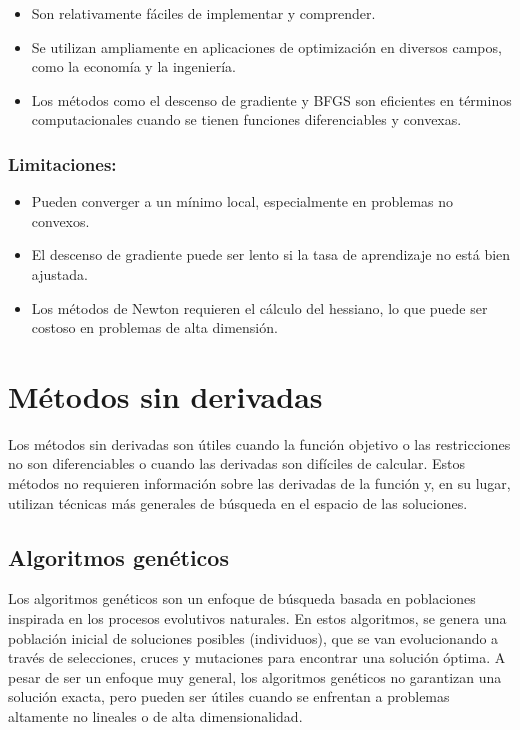 \begin{itemize}
	\item Son relativamente fáciles de implementar y comprender.
	\item Se utilizan ampliamente en aplicaciones de optimización en diversos campos, como la economía y la ingeniería.
	\item Los métodos como el descenso de gradiente y BFGS son eficientes en términos computacionales cuando se tienen funciones diferenciables y convexas.
\end{itemize}

\subsubsection{Limitaciones:}

\begin{itemize}
	\item Pueden converger a un mínimo local, especialmente en problemas no convexos.
	\item El descenso de gradiente puede ser lento si la tasa de aprendizaje no está bien ajustada.
	\item Los métodos de Newton requieren el cálculo del hessiano, lo que puede ser costoso en problemas de alta dimensión.
\end{itemize}

\section{Métodos sin derivadas}

\begin{flushleft}
	Los métodos sin derivadas son útiles cuando la función objetivo o las restricciones no son diferenciables o cuando las derivadas son difíciles de calcular. Estos métodos no requieren información sobre las derivadas de la función y, en su lugar, utilizan técnicas más generales de búsqueda en el espacio de las soluciones.
\end{flushleft}

\subsection{Algoritmos genéticos}

\begin{flushleft}
	Los algoritmos genéticos son un enfoque de búsqueda basada en poblaciones inspirada en los procesos evolutivos naturales. En estos algoritmos, se genera una población inicial de soluciones posibles (individuos), que se van evolucionando a través de selecciones, cruces y mutaciones para encontrar una solución óptima. A pesar de ser un enfoque muy general, los algoritmos genéticos no garantizan una solución exacta, pero pueden ser útiles cuando se enfrentan a problemas altamente no lineales o de alta dimensionalidad.
\end{flushleft}

